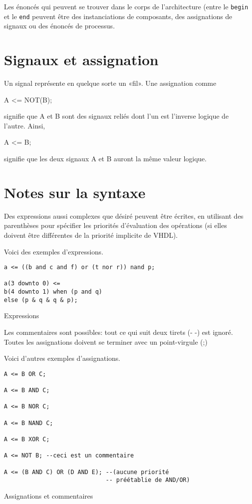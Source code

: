 \documentclass[letter, oneside]{book}
\begin{document}
Les énoncés qui peuvent se trouver dans le corps de l'architecture
(entre le \texttt{begin} et le \texttt{end} peuvent être des instanciations de
composants, des assignations de signaux ou des énoncés de processus.

\section{Signaux et assignation}
\label{sec:org69eb7bc}

Un signal représente en quelque sorte un «fil». Une assignation comme

A <= NOT(B);

signifie que A et B sont des signaux reliés dont l'un est l'inverse
logique de l'autre.  Ainsi,

A <= B; 

signifie que les deux signaux A et B auront la même valeur logique.

\section{Notes sur la syntaxe}
\label{sec:orgcf0def6}

Des expressions aussi complexes que désiré peuvent être écrites, en
utilisant des parenthèses pour spécifier les priorités d'évaluation
des opérations (si elles doivent être différentes de la priorité
implicite de VHDL).

Voici des exemples d'expressions.
\begin{listing}[htbp]
\begin{verbatim}
a <= ((b and c and f) or (t nor r)) nand p;

a(3 downto 0) <=
b(4 downto 1) when (p and q)
else (p & q & q & p);
\end{verbatim}
\caption{Expressions}
\end{listing}

Les commentaires sont possibles: tout ce qui suit deux tirets (- -)
est ignoré.  Toutes les assignations doivent se terminer avec un
point-virgule (;)

Voici d'autres exemples d'assignations.

\begin{listing}[htbp]
\begin{verbatim}
A <= B OR C;

A <= B AND C;

A <= B NOR C;

A <= B NAND C;

A <= B XOR C;

A <= NOT B; --ceci est un commentaire

A <= (B AND C) OR (D AND E); --(aucune priorité 
                             -- préétablie de AND/OR)
\end{verbatim}
\caption{Assignations et commentaires}
\end{listing}
\end{document}
